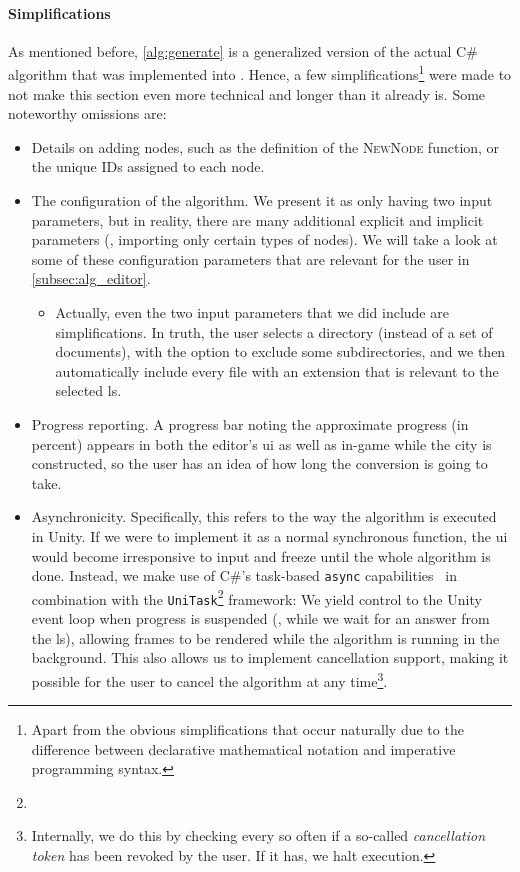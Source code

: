 \documentclass[../thesis]{subfiles}
\begin{document}
\paragraph{Simplifications}
As mentioned before, \cref{alg:generate} is a generalized version of the actual C\# algorithm that was implemented into \SEE{}.
Hence, a few simplifications\footnote{
	Apart from the obvious simplifications that occur naturally due to the difference between declarative mathematical notation and imperative programming syntax.
} were made to not make this section even more technical and longer than it already is.
Some noteworthy omissions are:
\begin{itemize}
	\item Details on adding nodes, such as the definition of the \textsc{NewNode} function, or the unique IDs assigned to each node.
	\item The configuration of the algorithm. We present it as only having two input parameters, but in reality, there are many additional explicit and implicit parameters (\eg, importing only certain types of nodes).
	      We will take a look at some of these configuration parameters that are relevant for the user in \cref{subsec:alg_editor}.
	      \begin{itemize}
		      \item Actually, even the two input parameters that we did include are simplifications.
		            In truth, the user selects a directory (instead of a set of documents), with the option to exclude some subdirectories, and we then automatically include every file with an extension that is relevant to the selected \gls{ls}.
	      \end{itemize}
	\item Progress reporting.
	      A progress bar noting the approximate progress (in percent) appears in both the \gls{editor}'s \gls{ui} as well as in-game while the \gls{city} is constructed, so the user has an idea of how long the conversion is going to take.
	\item Asynchronicity.
	      Specifically, this refers to the way the algorithm is executed in Unity.
	      If we were to implement it as a normal synchronous function, the \gls{ui} would become irresponsive to input and freeze until the whole algorithm is done.
	      Instead, we make use of C\#'s task-based \texttt{async} capabilities~\cite{wagner2023} in combination with the \texttt{UniTask}\footnote{
	      } framework:
	      We yield control to the Unity event loop when progress is suspended (\eg{}, while we wait for an answer from the \gls{ls}), allowing frames to be rendered while the algorithm is running in the background.
	      This also allows us to implement cancellation support, making it possible for the user to cancel the algorithm at any time\footnote{
		      Internally, we do this by checking every so often if a so-called \emph{cancellation token} has been revoked by the user. If it has, we halt execution.
	      }.
\end{itemize}
\end{document}
